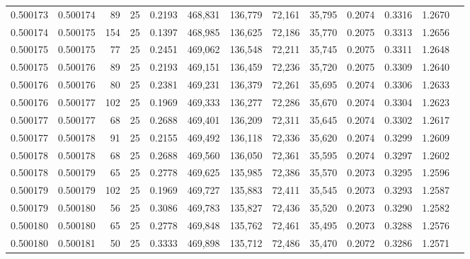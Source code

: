 \begin{tabular}{rrrrrrrrrrrrr}
0.500173 & 0.500174 &  89 &  25 &                                     0.2193 & 468,831 & 136,779 &  72,161 &  35,795 & 0.2074 & 0.3316 & 1.2670 \\
0.500174 & 0.500175 & 154 &  25 &                                     0.1397 & 468,985 & 136,625 &  72,186 &  35,770 & 0.2075 & 0.3313 & 1.2656 \\
0.500175 & 0.500175 &  77 &  25 &                                     0.2451 & 469,062 & 136,548 &  72,211 &  35,745 & 0.2075 & 0.3311 & 1.2648 \\
0.500175 & 0.500176 &  89 &  25 &                                     0.2193 & 469,151 & 136,459 &  72,236 &  35,720 & 0.2075 & 0.3309 & 1.2640 \\
0.500176 & 0.500176 &  80 &  25 &                                     0.2381 & 469,231 & 136,379 &  72,261 &  35,695 & 0.2074 & 0.3306 & 1.2633 \\
0.500176 & 0.500177 & 102 &  25 &                                     0.1969 & 469,333 & 136,277 &  72,286 &  35,670 & 0.2074 & 0.3304 & 1.2623 \\
0.500177 & 0.500177 &  68 &  25 &                                     0.2688 & 469,401 & 136,209 &  72,311 &  35,645 & 0.2074 & 0.3302 & 1.2617 \\
0.500177 & 0.500178 &  91 &  25 &                                     0.2155 & 469,492 & 136,118 &  72,336 &  35,620 & 0.2074 & 0.3299 & 1.2609 \\
0.500178 & 0.500178 &  68 &  25 &                                     0.2688 & 469,560 & 136,050 &  72,361 &  35,595 & 0.2074 & 0.3297 & 1.2602 \\
0.500178 & 0.500179 &  65 &  25 &                                     0.2778 & 469,625 & 135,985 &  72,386 &  35,570 & 0.2073 & 0.3295 & 1.2596 \\
0.500179 & 0.500179 & 102 &  25 &                                     0.1969 & 469,727 & 135,883 &  72,411 &  35,545 & 0.2073 & 0.3293 & 1.2587 \\
0.500179 & 0.500180 &  56 &  25 &                                     0.3086 & 469,783 & 135,827 &  72,436 &  35,520 & 0.2073 & 0.3290 & 1.2582 \\
0.500180 & 0.500180 &  65 &  25 &                                     0.2778 & 469,848 & 135,762 &  72,461 &  35,495 & 0.2073 & 0.3288 & 1.2576 \\
0.500180 & 0.500181 &  50 &  25 &                                     0.3333 & 469,898 & 135,712 &  72,486 &  35,470 & 0.2072 & 0.3286 & 1.2571 \\

\end{tabular}
